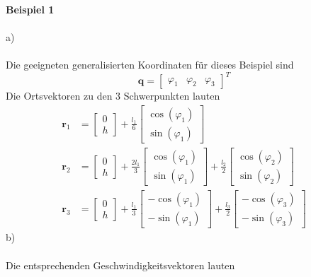 \textbf{Beispiel 1}\\ \\
a)\\ \\
Die geeigneten generalisierten Koordinaten für dieses Beispiel sind
\[
	\textbf{q} = \begin{bmatrix}
		\varphi_1 & \varphi_2 & \varphi_3
	\end{bmatrix}^T
\]
Die Ortsvektoren zu den 3 Schwerpunkten lauten
\begin{align*}
	\textbf{r}_1 &= \begin{bmatrix}
	 0 \\
	 h
	\end{bmatrix}
	+
	\frac{l_1}{6}
	\begin{bmatrix}
		\cos(\varphi_1) \\
		\sin(\varphi_1)
	\end{bmatrix} \\
	\textbf{r}_2 &= \begin{bmatrix}
	 	0 \\
	 	h
	\end{bmatrix}
	+
	\frac{2l_1}{3}
	\begin{bmatrix}
		\cos(\varphi_1) \\
		\sin(\varphi_1)
	\end{bmatrix}
	+
	\frac{l_2}{2}
	\begin{bmatrix}
		\cos(\varphi_2) \\
		\sin(\varphi_2)
	\end{bmatrix} \\
	\textbf{r}_3 &= \begin{bmatrix}
	0 \\
	h
	\end{bmatrix}
	+
	\frac{l_1}{3}
	\begin{bmatrix}
		-\cos(\varphi_1) \\
		-\sin(\varphi_1)
	\end{bmatrix}
	+
	\frac{l_3}{2}
	\begin{bmatrix}
		-\cos(\varphi_3) \\
		-\sin(\varphi_3)
	\end{bmatrix}
\end{align*}
\newpage
\noindent
b) \\ \\
Die entsprechenden Geschwindigkeitsvektoren lauten

